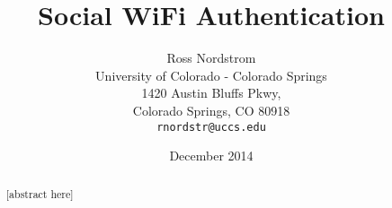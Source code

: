 \documentclass{sig-alternate}
\begin{document}
\title{Social WiFi Authentication}
\author{Ross Nordstrom\\
        University of Colorado - Colorado Springs\\
        1420 Austin Bluffs Pkwy,\\
        Colorado Springs, CO 80918\\
        \texttt{rnordstr@uccs.edu}
       }
\date{December 2014}

\maketitle

\begin{abstract}
   [abstract here]
\end{abstract}










{}

\end{document}
